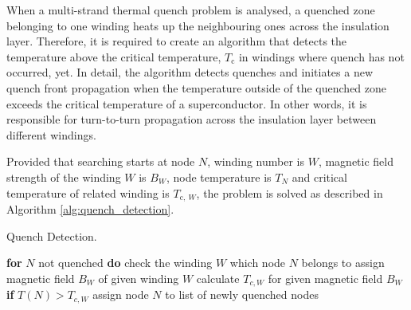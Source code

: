 
When a multi-strand thermal quench problem is analysed, a quenched zone belonging to one winding heats up the neighbouring ones across the insulation layer. Therefore, it is required to create an algorithm that detects the temperature above the critical temperature, $T_\text{c}$ in windings where quench has not occurred, yet. In detail, the algorithm detects quenches and initiates a new quench front propagation when the temperature outside of the quenched zone exceeds the critical temperature of a superconductor. In other words, it is responsible for turn-to-turn propagation across the insulation layer between different windings.

Provided that searching starts at node $N$, winding number is $W$, magnetic field strength of the winding $W$ is $B_W$, node temperature is $T_N$ and critical temperature of related winding is $T_{\text{c},~W}$, the problem is solved as described in Algorithm \ref{alg:quench_detection}.

\begin{algorithm}[H]
    \caption{Quench Detection.}
    \label{alg:quench_detection}
    \begin{algorithmic}[1]
    \STATE \textbf{for} $N$ not quenched \textbf{do}
    \STATE \hspace{0.5cm} check the winding $W$ which node $N$ belongs to
    \STATE \hspace{0.5cm} assign magnetic field $B_W$ of given winding $W$
    \STATE \hspace{0.5cm} calculate $T_{c,W}$ for given magnetic field $B_W$
    \STATE \hspace{0.5cm} \textbf{if} $T(N) > T_{c,W}$
    \STATE \hspace{1.0cm} assign node $N$ to list of newly quenched nodes
    \end{algorithmic}
\end{algorithm}